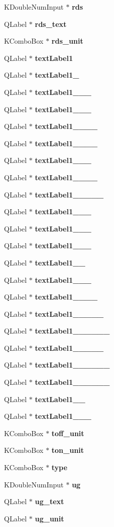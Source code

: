 \begin{CompactItemize}
KDouble\-Num\-Input $\ast$ {\bf rds}
\item 
QLabel $\ast$ {\bf rds\_\-text}
\item 
KCombo\-Box $\ast$ {\bf rds\_\-unit}
\item 
QLabel $\ast$ {\bf text\-Label1}
\item 
QLabel $\ast$ {\bf text\-Label1\_}
\item 
QLabel $\ast$ {\bf text\-Label1\_\_\_}
\item 
QLabel $\ast$ {\bf text\-Label1\_\_\_}
\item 
QLabel $\ast$ {\bf text\-Label1\_\_\_\_}
\item 
QLabel $\ast$ {\bf text\-Label1\_\_\_\_}
\item 
QLabel $\ast$ {\bf text\-Label1\_\_\_}
\item 
QLabel $\ast$ {\bf text\-Label1\_\_\_\_}
\item 
QLabel $\ast$ {\bf text\-Label1\_\_\_\_\_}
\item 
QLabel $\ast$ {\bf text\-Label1\_\_\_}
\item 
QLabel $\ast$ {\bf text\-Label1\_\_\_}
\item 
QLabel $\ast$ {\bf text\-Label1\_\_\_}
\item 
QLabel $\ast$ {\bf text\-Label1\_\_}
\item 
QLabel $\ast$ {\bf text\-Label1\_\_\_}
\item 
QLabel $\ast$ {\bf text\-Label1\_\_\_\_}
\item 
QLabel $\ast$ {\bf text\-Label1\_\_\_\_\_}
\item 
QLabel $\ast$ {\bf text\-Label1\_\_\_\_\_\_}
\item 
QLabel $\ast$ {\bf text\-Label1\_\_\_\_\_}
\item 
QLabel $\ast$ {\bf text\-Label1\_\_\_\_\_\_}
\item 
QLabel $\ast$ {\bf text\-Label1\_\_\_\_\_\_}
\item 
QLabel $\ast$ {\bf text\-Label1\_\_}
\item 
QLabel $\ast$ {\bf text\-Label1\_\_\_}
\item 
KCombo\-Box $\ast$ {\bf toff\_\-unit}
\item 
KCombo\-Box $\ast$ {\bf ton\_\-unit}
\item 
KCombo\-Box $\ast$ {\bf type}
\item 
KDouble\-Num\-Input $\ast$ {\bf ug}
\item 
QLabel $\ast$ {\bf ug\_\-text}
\item 
QLabel $\ast$ {\bf ug\_\-unit}
\end{CompactItemize}
